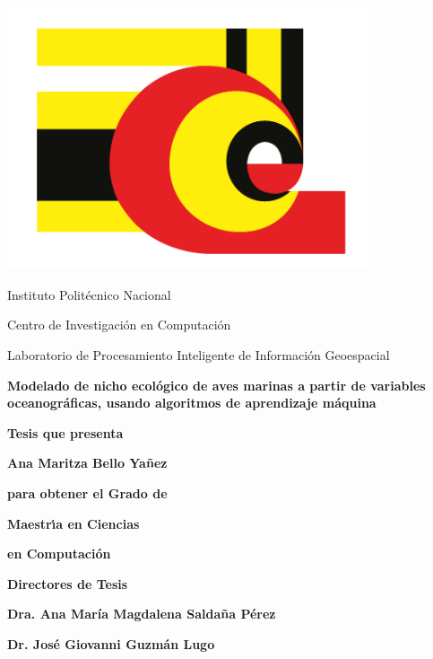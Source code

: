 \begin{minipage}{0.18\textwidth}
	\includegraphics[width=0.8\textwidth]{imagen/logo-cic.png}
\end{minipage}%
\begin{minipage}{0.82\textwidth}
\begin{center}
	\large \sc Instituto Politécnico Nacional
\end{center}
\end{minipage}

\vspace{0.5cm}
\centerline{\Large Centro de Investigación en Computación}
\vspace{0.5cm}
\centerline{\Large Laboratorio de Procesamiento Inteligente de Información Geoespacial}

\begin{center}
\Large \bf
Modelado de nicho ecológico de aves marinas a partir de variables
oceanográficas, usando algoritmos de aprendizaje máquina
\end{center}

\centerline{\Large \bf Tesis que presenta}
\vspace{0.5cm}
\centerline{\Large \bf Ana Maritza Bello Yañez}
\vspace{0.5cm}
\centerline{\Large \bf para obtener el Grado de}
\vspace{0.5cm}
\centerline{\Large \bf Maestr\'\i a en Ciencias}
\vspace{0.5cm}
\centerline{\Large \bf en Computaci\'on}
\vspace{0.5cm}
\centerline{\Large \bf }
\vspace{1.2cm}
\centerline{\Large \bf Directores de Tesis}
\vspace{0.5cm}
\centerline{\Large \bf Dra. Ana María Magdalena Saldaña Pérez }
\centerline{\Large \bf Dr. José Giovanni Guzmán Lugo }
 
